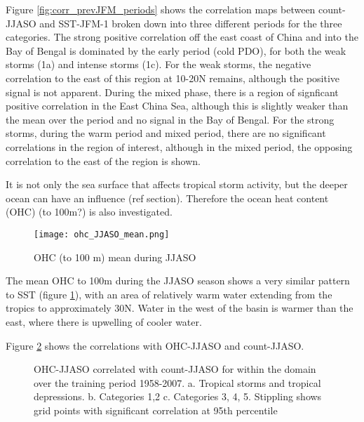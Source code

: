 Figure \ref{fig:corr_prevJFM_periods} shows the correlation maps between count-JJASO and SST-JFM-1 broken down into three different periods for the three categories. 
The strong positive correlation off the east coast of China and into the Bay of Bengal is dominated by the early period (cold PDO), for both the weak storms (1a) and intense storms (1c). For the weak storms, the negative correlation to the east of this region at 10-20N remains, although the positive signal is not apparent. During the mixed phase, there is a region of signficant positive correlation in the East China Sea, although this is slightly weaker than the mean over the period and no signal in the Bay of Bengal.
For the strong storms, during the warm period and mixed period, there are no significant correlations in the region of interest, although in the mixed period, the opposing correlation to the east of the region is shown.



It is not only the sea surface that affects tropical storm activity, but the deeper ocean can have an influence (ref section). Therefore the ocean heat content (OHC) (to 100m?) is also investigated.

\begin{figure} %
	\centering %
	\noindent\texttt{[image: ohc\_JJASO\_mean.png]}
	\caption{OHC (to 100 m) mean during JJASO}\label{fig:OHC_JJASO}
\end{figure}

The mean OHC to 100m during the JJASO season shows a very similar pattern to SST (figure \ref{fig:OHC_JJASO}), with an area of relatively warm water extending from the tropics to approximately 30N. Water in the west of the basin is warmer than the east, where there is upwelling of cooler water.


Figure \ref{fig:ohc_currJJASO} shows the correlations with OHC-JJASO and count-JJASO.

\begin{figure}
	\centering %

	\caption{OHC-JJASO correlated with count-JJASO for within the domain over the training period 1958-2007. a. Tropical storms and tropical depressions. b. Categories 1,2 c. Categories 3, 4, 5. Stippling shows grid points with significant correlation at 95th percentile} \label{fig:ohc_currJJASO} 
\end{figure} 

